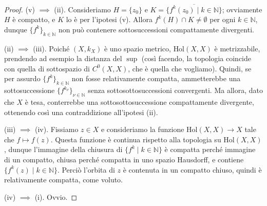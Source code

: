 \begin{proof}
    (v) $\implies$ (ii). Consideriamo $H=\{z_0\}$ e $K=\overline{\{f^k(z_0)\mid k\in\mathbb{N}\}}$; ovviamente $H$ è compatto, e $K$ lo è per l'ipotesi (v). Allora $f^k(H)\cap K\not=\emptyset$ per ogni $k\in\mathbb{N}$, dunque $\{f^k\}_{k \in \mathbb{N}}$ non può contenere sottosuccessioni compattamente divergenti.

    (ii) $\implies$ (iii). Poiché $(X,k_X)$ è uno spazio metrico, $\text{Hol}(X,X)$ è metrizzabile, prendendo ad esempio la distanza del $\sup$ (così facendo, la topologia coincide con quella di sottospazio di $C^0(X,X)$, che è quella che vogliamo). Quindi, se per assurdo $\{f^k\}_{k \in \mathbb{N}}$ non fosse relativamente compatta, ammetterebbe una sottosuccessione $\{f^{k_\nu}\}_{\nu\in\mathbb{N}}$ senza sottosottosuccessioni convergenti. Ma allora, dato che $X$ è tesa, conterrebbe una sottosottosuccessione compattamente divergente, ottenendo così una contraddizione all'ipotesi (ii).

    (iii) $\implies$ (iv). Fissiamo $z\in X$ e consideriamo la funzione $\text{Hol}(X,X)\longrightarrow X$ tale che $f\longmapsto f(z)$. Questa funzione è continua rispetto alla topologia su $\text{Hol}(X,X)$, dunque l'immagine della chiusura di $\{f^k\mid k\in\mathbb{N}\}$ è compatta perché immagine di un compatto, chiusa perché compatta in uno spazio Hausdorff, e contiene $\{f^k(z)\mid k\in\mathbb{N}\}$. Perciò l'orbita di $z$ è contenuta in un compatto chiuso, quindi è relativamente compatta, come voluto.

    (iv) $\implies$ (i). Ovvio.


\end{proof}
